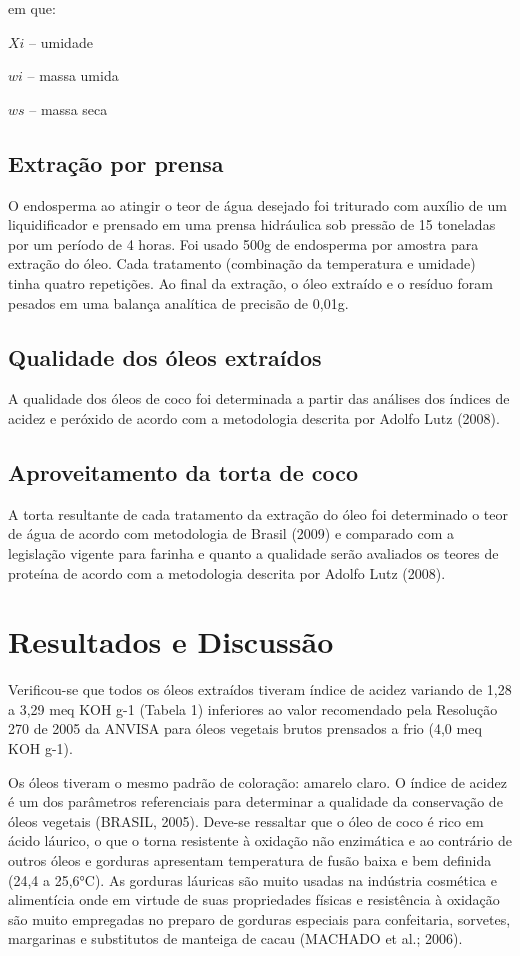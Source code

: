 \documentclass[article,12pt,onesidea,4paper,english,brazil]{abntex2}
\begin{document}
\noindent 	em que:
	
\noindent 	$Xi$ -- umidade
	
\noindent 	$wi$ -- massa umida
	
\noindent 	$ws$ -- massa seca
	
\subsection*{Extração por prensa}
	
	O endosperma ao atingir o teor de água desejado foi triturado com auxílio de um liquidificador e prensado em uma prensa hidráulica sob pressão de 15 toneladas por um período de 4 horas. Foi usado 500g de endosperma por amostra para extração do óleo. Cada tratamento (combinação da temperatura e umidade) tinha quatro repetições. Ao final da extração, o óleo extraído e o resíduo foram pesados em uma balança analítica de precisão de 0,01g.
	
\subsection*{Qualidade dos óleos extraídos}
	A qualidade dos óleos de coco foi determinada a partir das análises dos índices de acidez e peróxido de acordo com a metodologia descrita por Adolfo Lutz (2008).
	
\subsection*{Aproveitamento da torta de coco}
	
	A torta resultante de cada tratamento da extração do óleo foi determinado o teor de água de acordo com metodologia de Brasil (2009) e comparado com a legislação vigente para farinha e quanto a qualidade serão avaliados os teores de proteína de acordo com a metodologia descrita por Adolfo Lutz (2008).
	
	
	
	\section*{Resultados e Discussão}
	
Verificou-se que todos os óleos extraídos tiveram índice de acidez variando de 1,28 a 3,29 meq KOH g-1 (Tabela 1) inferiores ao valor recomendado pela Resolução 270 de 2005 da ANVISA para óleos vegetais brutos prensados a frio (4,0 meq KOH g-1).

Os óleos tiveram o mesmo padrão de coloração: amarelo claro. O índice de acidez é um dos parâmetros referenciais para determinar a qualidade da conservação de óleos vegetais (BRASIL, 2005). Deve-se ressaltar que o óleo de coco é rico em ácido láurico, o que o torna resistente à oxidação não enzimática e ao contrário de outros óleos e gorduras apresentam temperatura de fusão baixa e bem definida (24,4 a 25,6°C). As gorduras láuricas são muito usadas na indústria cosmética e alimentícia onde em virtude de suas propriedades físicas e resistência à oxidação são muito empregadas no preparo de gorduras especiais para confeitaria, sorvetes, margarinas e substitutos de manteiga de cacau (MACHADO et al.; 2006).
\end{document}
